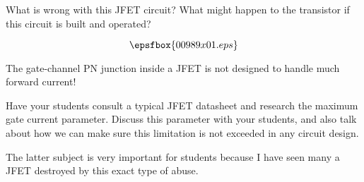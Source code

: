 

What is wrong with this JFET circuit?  What might happen to the transistor if this circuit is built and operated?

$$\epsfbox{00989x01.eps}$$







The gate-channel PN junction inside a JFET is not designed to handle much forward current!







Have your students consult a typical JFET datasheet and research the maximum gate current parameter.  Discuss this parameter with your students, and also talk about how we can make sure this limitation is not exceeded in any circuit design.

The latter subject is very important for students because I have seen many a JFET destroyed by this exact type of abuse.




